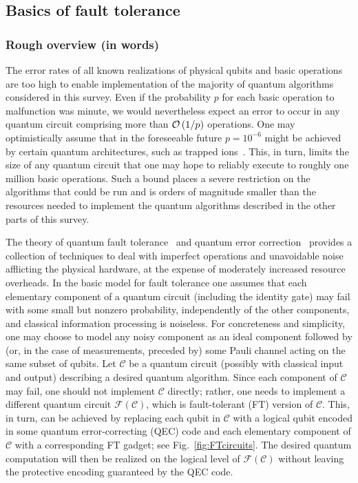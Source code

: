 
\begin{refsection}

\section{Basics of fault tolerance}\label{prim:FaultTolerance}

\subsubsection*{Rough overview (in words)}

The error rates of all known realizations of physical qubits and basic operations are too high to enable implementation of the majority of quantum algorithms considered in this survey.
Even if the probability $p$ for each basic operation to malfunction was minute, we would nevertheless expect an error to occur in any quantum circuit comprising more than $\mathcal{O}\left( 1/p \right)$ operations.
One may optimistically assume that in the foreseeable future $p= 10^{-6}$ might be achieved by certain quantum architectures, such as trapped ions~\cite{bermudez2017trappedIonFaultTolerant,bruzewicz2019trappedIonProgressChallenges}.
This, in turn, limits the size of any quantum circuit that one may hope to reliably execute to roughly one million basic operations.  
Such a bound places a severe restriction on the algorithms that could be run and is orders of magnitude smaller than the resources needed to implement the quantum algorithms described in the other parts of this survey. 


The theory of quantum fault tolerance~\cite{shor1996FTQC} and quantum error correction~\cite{shor1995SchemeReducingDecoherence,steane1996ErrorCorrectingQuantum,gottesman1996QECCodesSaturatingHammingBound} provides a collection of techniques to deal with imperfect operations and unavoidable noise afflicting the physical hardware, at the expense of moderately increased resource overheads.
In the basic model for fault tolerance one assumes that each elementary component of a quantum circuit (including the identity gate) may fail with some small but nonzero probability, independently of the other components, and classical information processing is noiseless.
For concreteness and simplicity, one may choose to model any noisy component as an ideal component followed by (or, in the case of measurements, preceded by) some Pauli channel acting on the same subset of qubits.
Let $\mathcal C$ be a quantum circuit (possibly with classical input and output) describing a desired quantum algorithm.
Since each component of $\mathcal C$ may fail, one should not implement $\mathcal C$ directly; rather, one needs to implement a different quantum circuit $\mathcal F(\mathcal C)$, which is fault-tolerant (FT) version of $\mathcal C$.
This, in turn, can be achieved by replacing each qubit in $\mathcal C$ with a logical qubit encoded in some quantum error-correcting (QEC) code and each elementary component of $\mathcal C$ with a corresponding FT gadget; see Fig.~\ref{fig:FTcircuits}.
The desired quantum computation will then be realized on the logical level of $\mathcal F(\mathcal C)$ without leaving the protective encoding guaranteed by the QEC code.


\end{refsection}
